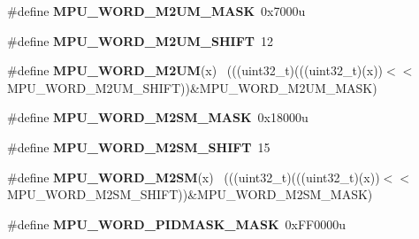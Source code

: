 \begin{DoxyCompactItemize}
\item 
\hypertarget{group___m_p_u___register___masks_ga8ac2b629f0deac03fa994c2159e8714c}{}\#define {\bfseries M\+P\+U\+\_\+\+W\+O\+R\+D\+\_\+\+M2\+U\+M\+\_\+\+M\+A\+S\+K}~0x7000u\label{group___m_p_u___register___masks_ga8ac2b629f0deac03fa994c2159e8714c}

\item 
\hypertarget{group___m_p_u___register___masks_gab0b3fbb6bf7c3bf27b3e26ed22015a9a}{}\#define {\bfseries M\+P\+U\+\_\+\+W\+O\+R\+D\+\_\+\+M2\+U\+M\+\_\+\+S\+H\+I\+F\+T}~12\label{group___m_p_u___register___masks_gab0b3fbb6bf7c3bf27b3e26ed22015a9a}

\item 
\hypertarget{group___m_p_u___register___masks_gaf4c62967d9bb5b92777d5524c099f95d}{}\#define {\bfseries M\+P\+U\+\_\+\+W\+O\+R\+D\+\_\+\+M2\+U\+M}(x)                                              ~(((uint32\+\_\+t)(((uint32\+\_\+t)(x))$<$$<$M\+P\+U\+\_\+\+W\+O\+R\+D\+\_\+\+M2\+U\+M\+\_\+\+S\+H\+I\+F\+T))\&M\+P\+U\+\_\+\+W\+O\+R\+D\+\_\+\+M2\+U\+M\+\_\+\+M\+A\+S\+K)\label{group___m_p_u___register___masks_gaf4c62967d9bb5b92777d5524c099f95d}

\item 
\hypertarget{group___m_p_u___register___masks_ga1fd18149f5a26686b45d9bbc90de70e0}{}\#define {\bfseries M\+P\+U\+\_\+\+W\+O\+R\+D\+\_\+\+M2\+S\+M\+\_\+\+M\+A\+S\+K}~0x18000u\label{group___m_p_u___register___masks_ga1fd18149f5a26686b45d9bbc90de70e0}

\item 
\hypertarget{group___m_p_u___register___masks_ga0e28cfb776dbafafa4c04e094872ecc9}{}\#define {\bfseries M\+P\+U\+\_\+\+W\+O\+R\+D\+\_\+\+M2\+S\+M\+\_\+\+S\+H\+I\+F\+T}~15\label{group___m_p_u___register___masks_ga0e28cfb776dbafafa4c04e094872ecc9}

\item 
\hypertarget{group___m_p_u___register___masks_ga871bc0506da3b310637f72847dc00926}{}\#define {\bfseries M\+P\+U\+\_\+\+W\+O\+R\+D\+\_\+\+M2\+S\+M}(x)                                              ~(((uint32\+\_\+t)(((uint32\+\_\+t)(x))$<$$<$M\+P\+U\+\_\+\+W\+O\+R\+D\+\_\+\+M2\+S\+M\+\_\+\+S\+H\+I\+F\+T))\&M\+P\+U\+\_\+\+W\+O\+R\+D\+\_\+\+M2\+S\+M\+\_\+\+M\+A\+S\+K)\label{group___m_p_u___register___masks_ga871bc0506da3b310637f72847dc00926}

\item 
\hypertarget{group___m_p_u___register___masks_ga2cf92c8c19cd17c1c81c8c9a56f112d7}{}\#define {\bfseries M\+P\+U\+\_\+\+W\+O\+R\+D\+\_\+\+P\+I\+D\+M\+A\+S\+K\+\_\+\+M\+A\+S\+K}~0x\+F\+F0000u\label{group___m_p_u___register___masks_ga2cf92c8c19cd17c1c81c8c9a56f112d7}


\end{DoxyCompactItemize}
